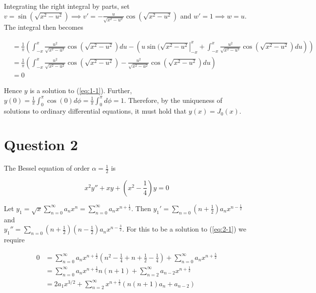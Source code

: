 \documentclass{article}
\begin{document}
Integrating the right integral by parts, set
$v = \sin(\sqrt{x^2 - u^2}) \implies v' = -\frac{u}{\sqrt{x^2 - u^2}}\cos(\sqrt{x^2 - u^2})$ and
$w' = 1 \implies w = u$. The integral then becomes

\begin{align*}
    &= \frac{1}{\pi}\left(\int_{-x}^x\frac{u^2}{\sqrt{x^2 - u^2}}\cos(\sqrt{x^2 - u^2}) du
        - \left(\left.u\sin(\sqrt{x^2 - u^2}\right|_{-x}^x
        + \int_{-x}^x \frac{u^2}{\sqrt{x^2 - u^2}}\cos(\sqrt{x^2 - u^2}) du\right)\right)\\
    &= \frac{1}{\pi}\left(\int_{-x}^x \frac{u^2}{\sqrt{x^2 - u^2}}\cos(\sqrt{x^2 - u^2})
        - \frac{u^2}{\sqrt{x^2 - u^2}}\cos(\sqrt{x^2 - u^2}) du\right)\\
    &= 0
\end{align*}

Hence $y$ is a solution to (\ref{eq:1-1}). Further,
$y(0) = \frac{1}{\pi}\int_0^\pi \cos(0)d\phi = \frac{1}{\pi}\int_0^\pi d\phi= 1$. Therefore,
by the uniqueness of solutions to ordinary differential equations, it must hold that
$y(x) = J_0(x)$.

\section*{Question 2}

The Bessel equation of order $\alpha = \frac{1}{2}$ is

\begin{equation} \label{eq:2-1}
    x^2y'' + xy + \left(x^2 - \frac{1}{4}\right)y = 0
\end{equation}

Let $y_1 = \sqrt{x}\sum_{n = 0}^\infty a_nx^n = \sum_{n = 0}^\infty a_n x^{n + \frac{1}{2}}$.
Then $y_1' = \sum_{n = 0}(n + \frac{1}{2})a_nx^{n - \frac{1}{2}}$ and\\
$y_1'' = \sum_{n = 0}(n + \frac{1}{2})(n - \frac{1}{2})a_nx^{n - \frac{3}{2}}$. For this to be a solution
to (\ref{eq:2-1}) we require

\begin{align*}
    0 &= \sum_{n = 0}^\infty a_nx^{n + \frac{1}{2}}\left(n^2 - \frac{1}{4} + n + \frac{1}{2} - \frac{1}{4}\right)
        + \sum_{n = 0}^\infty a_nx^{n + \frac{5}{2}}\\
    &= \sum_{n = 0}^\infty a_nx^{n + \frac{1}{2}}n(n + 1)
        + \sum_{n = 2}^\infty a_{n - 2}x^{n + \frac{1}{2}}\\
    &= 2a_1x^{3/2} + \sum_{n = 2}^\infty x^{n + \frac{1}{2}}(n(n + 1)a_n + a_{n - 2})
\end{align*}
\end{document}
